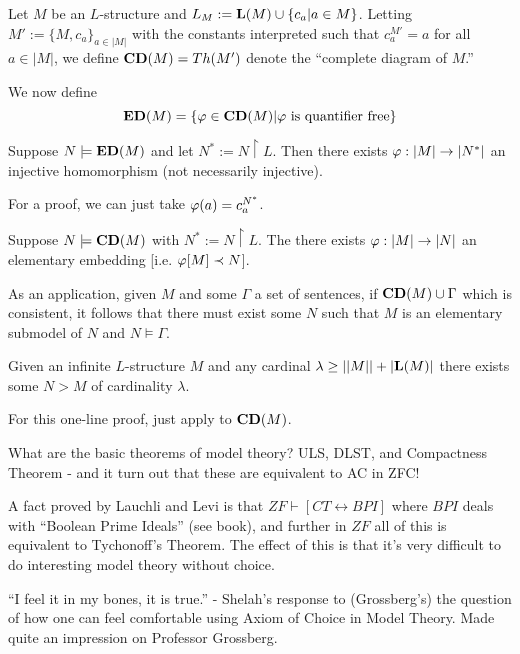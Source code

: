 \begin{boxdefinition}
    Let $M$ be an $L$-structure and $L_M:=\mathbf{L}(M)\cup \{c_a|a\in M\}$. Letting $M':=\{ M, c_a\}_{a\in |M|}$ with the constants interpreted such that $c_a^{M'}=a$ for all $a\in |M|$, we define $\mathbf{CD}(M)=Th(M')$ denote the ``complete diagram of $M$.''
 \end{boxdefinition}

 \begin{boxdefinition} 
     We now define $$\mathbf{ED}(M)=\{\varphi \in \mathbf{CD}(M)|\varphi\text{ is quantifier free}\}$$
 \end{boxdefinition}

 \begin{boxlemma}[Lemma 1]
     Suppose $N\models \mathbf{ED}(M)$ and let $N^*:=N\restriction L$. Then there exists $\varphi:|M|\rightarrow |N^*|$ an injective homomorphism (not necessarily injective).
 \end{boxlemma}
 For a proof, we can just take $\varphi(a)=c_a^{N^*}$.

 \begin{boxlemma}[Lemma 2]
     Suppose $N\models \mathbf{CD}(M)$ with $N^*:= N\restriction L$. The there exists $\varphi:|M|\rightarrow |N|$ an elementary embedding [i.e. $\varphi[M]\prec N$].
 \end{boxlemma}

 As an application, given $M$ and some $\Gamma$ a set of sentences, if $\mathbf{CD}(M)\cup \Gamma$ which is consistent, it follows that there must exist some $N$ such that $M$ is an elementary submodel of $N$ and $N\models \Gamma$.

 \begin{boxtheorem}
     Given an infinite $L$-structure $M$ and any cardinal $\lambda\geq ||M||+|\mathbf{L}(M)|$ there exists some $N>M$ of cardinality $\lambda$.
 \end{boxtheorem}
 For this one-line proof, just apply \sorry to $\mathbf{CD}(M)$.

 What are the basic theorems of model theory? ULS, DLST, and Compactness Theorem - and it turn out that these are equivalent to AC in ZFC!

\begin{remark}
     A fact proved by Lauchli and Levi is that $ZF\vdash [CT\leftrightarrow BPI]$ where $BPI$ deals with ``Boolean Prime Ideals'' \sorry (see book), and further in $ZF$ all of this is equivalent to Tychonoff's Theorem. The effect of this is that it's very difficult to do interesting model theory without choice.
\end{remark}
\begin{remark}
    ``I feel it in my bones, it is true.'' - Shelah's response to (Grossberg's) the question of how one can feel comfortable using Axiom of Choice in Model Theory. Made quite an impression on Professor Grossberg.
\end{remark}

